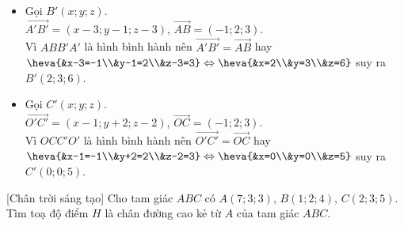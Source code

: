 \begin{bt}
{\begin{itemize}
			\item Gọi $ B'(x;y;z) $.\\
			$ \vec{A'B'}=(x-3;y-1;z-3) $, $ \vec{AB}=(-1;2;3) $.\\
			Vì $ ABB'A' $ là hình bình hành nên $ \vec{A'B'}=\vec{AB} $ hay \\
			$ \heva{&x-3=-1\\&y-1=2\\&z-3=3}\Leftrightarrow \heva{&x=2\\&y=3\\&z=6} $ suy ra $ B'(2;3;6) $.
			\item Gọi $ C'(x;y;z) $.\\
			$ \vec{O'C'}=(x-1;y+2;z-2) $, $ \vec{OC}=(-1;2;3) $.\\
			Vì $ OCC'O' $ là hình bình hành nên $ \vec{O'C'}=\vec{OC} $ hay\\
			$ \heva{&x-1=-1\\&y+2=2\\&z-2=3}\Leftrightarrow \heva{&x=0\\&y=0\\&z=5} $ suy ra $ C'(0;0;5) $.
		\end{itemize}
		
		
	}
\end{bt}

\begin{bt}%
[Chân trời sáng tạo]
	Cho tam giác $ABC$ có $A(7; 3; 3)$, $B(1; 2; 4)$, $C(2; 3; 5)$. Tìm toạ độ điểm $H$ là chân đường cao kẻ từ $A$ của tam giác $ABC$.
\end{bt}

